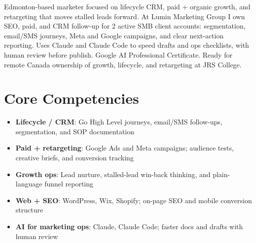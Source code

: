\documentclass[11pt,a4paper,sans]{moderncv}
\begin{document}
\makecvtitle

\vspace{6pt}
\small{Edmonton-based marketer focused on lifecycle CRM, paid + organic growth, and retargeting that moves stalled leads forward. At Lumin Marketing Group I own SEO, paid, and CRM follow-up for 2 active SMB client accounts: segmentation, email/SMS journeys, Meta and Google campaigns, and clear next-action reporting. Uses Claude and Claude Code to speed drafts and ops checklists, with human review before publish. Google AI Professional Certificate. Ready for remote Canada ownership of growth, lifecycle, and retargeting at JRS College.}

\section{Core Competencies}
\vspace{1pt}
\begin{itemize}
\item \textbf{Lifecycle / CRM}: Go High Level journeys, email/SMS follow-ups, segmentation, and SOP documentation
\item \textbf{Paid + retargeting}: Google Ads and Meta campaigns; audience tests, creative briefs, and conversion tracking
\item \textbf{Growth ops}: Lead nurture, stalled-lead win-back thinking, and plain-language funnel reporting
\item \textbf{Web + SEO}: WordPress, Wix, Shopify; on-page SEO and mobile conversion structure
\item \textbf{AI for marketing ops}: Claude, Claude Code; faster docs and drafts with human review
\end{itemize}
\end{document}
